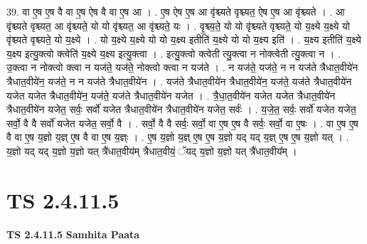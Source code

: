 \documentclass[17pt]{extarticle}
\begin{document}
39. वा ए॒ष ए॒ष वै वा ए॒ष ऐष वै वा ए॒ष आ । . ए॒ष ऐष ए॒ष आ वृ॑श्च्यते वृश्च्यत॒ ऐष ए॒ष आ वृ॑श्च्यते । . आ वृ॑श्च्यते वृश्च्यत॒ आ वृ॑श्च्यते॒ यो यो वृ॑श्च्यत॒ आ वृ॑श्च्यते॒ यः । . वृ॒श्च्य॒ते॒ यो यो वृ॑श्च्यते वृश्च्यते॒ यो य॒क्ष्ये य॒क्ष्ये यो वृ॑श्च्यते वृश्च्यते॒ यो य॒क्ष्ये । . यो य॒क्ष्ये य॒क्ष्ये यो यो य॒क्ष्य इतीति॑ य॒क्ष्ये यो यो य॒क्ष्य इति॑ । . य॒क्ष्य इतीति॑ य॒क्ष्ये य॒क्ष्य इत्यु॒क्त्वो क्त्वेति॑ य॒क्ष्ये य॒क्ष्य इत्यु॒क्त्वा । . इत्यु॒क्त्वो क्त्वेती त्यु॒क्त्वा न नोक्त्वेती त्यु॒क्त्वा न । . उ॒क्त्वा न नोक्त्वो क्त्वा न यज॑ते॒ यज॑ते॒ नोक्त्वो क्त्वा न यज॑ते । . न यज॑ते॒ यज॑ते॒ न न यज॑ते त्रैधात॒वीये॑न त्रैधात॒वीये॑न॒ यज॑ते॒ न न यज॑ते त्रैधात॒वीये॑न । . यज॑ते त्रैधात॒वीये॑न त्रैधात॒वीये॑न॒ यज॑ते॒ यज॑ते त्रैधात॒वीये॑न यजेत यजेत त्रैधात॒वीये॑न॒ यज॑ते॒ यज॑ते त्रैधात॒वीये॑न यजेत । . त्रै॒धा॒त॒वीये॑न यजेत यजेत त्रैधात॒वीये॑न त्रैधात॒वीये॑न यजेत॒ सर्वः॒ सर्वो॑ यजेत त्रैधात॒वीये॑न त्रैधात॒वीये॑न यजेत॒ सर्वः॑ । . य॒जे॒त॒ सर्वः॒ सर्वो॑ यजेत यजेत॒ सर्वो॒ वै वै सर्वो॑ यजेत यजेत॒ सर्वो॒ वै । . सर्वो॒ वै वै सर्वः॒ सर्वो॒ वा ए॒ष ए॒ष वै सर्वः॒ सर्वो॒ वा ए॒षः । . वा ए॒ष ए॒ष वै वा ए॒ष य॒ज्ञो य॒ज्ञ् ए॒ष वै वा ए॒ष य॒ज्ञ्ः । . ए॒ष य॒ज्ञो य॒ज्ञ् ए॒ष ए॒ष य॒ज्ञो यद् यद् य॒ज्ञ् ए॒ष ए॒ष य॒ज्ञो यत् । . य॒ज्ञो यद् यद् य॒ज्ञो य॒ज्ञो यत् त्रै॑धात॒वीय॑म् त्रैधात॒वीयं॒ ॅयद् य॒ज्ञो य॒ज्ञो यत् त्रै॑धात॒वीय᳚म् । \newline
\pagebreak
{}

\section{ TS 2.4.11.5 }

\textbf{TS 2.4.11.5 } \newline
\textbf{Samhita Paata} \newline
\end{document}
